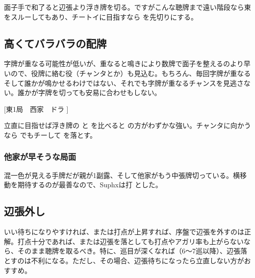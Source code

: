 \documentclass[10pt, twocolumn]{article}
\begin{document}
面子手で和了ると辺張より浮き牌を切る。ですがこんな聴牌まで遠い階段なら東をスルーしてもあり、チートイに目指すなら  を先切りにする。

\subsection{高くてバラバラの配牌}

字牌が重なる可能性が低いが、重なると鳴きにより数牌で面子を整えるのより早いので、役牌に絡む役（チャンタとか）も見込む。もちろん、毎回字牌が重なるそして誰かが鳴かせるわけではない、それでも字牌が重なるチャンスを見逃さない。誰かが字牌を切っても安易に合わせもしない\citep[][pp. 56--63]{tetsusenryaku}。

[東1局　西家　ドラ ]

立直に目指せば浮き牌の  と  を比べると  の方がわずかな強い。チャンタに向かうなら  でもチーして  を落とす。

\subsubsection*{他家が早そうな局面}

\begin{rittai}[h]
  \centering
  
  
  \caption{手牌が多くて他家が早そうな局面}
  \label{rittai:joban-far}
\end{rittai}

混一色が見える手牌だが親が1副露、そして他家がもう中張牌切っている。横移動を期待するのが最善なので、Suphxは打  とした\citep[][p.~35]{suphx}。

\subsection{辺張外し}

いい待ちになりやすければ、または打点が上昇すれば、序盤で辺張を外すのは正解。打点十分であれば、または辺張を落としても打点やアガリ率も上がらないなら、そのまま聴牌を取るべき。特に、巡目が深くなれば（6〜7巡以降）、辺張落とすのは不利になる。ただし、その場合、辺張待ちになったら立直しない方がおすすめ\citep[][pp. 48--55]{tetsusenryaku}。
\end{document}
